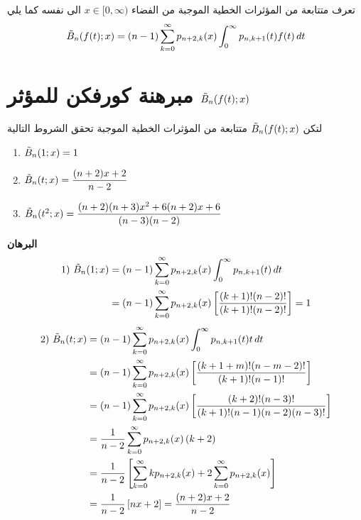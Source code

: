 تعرف متتابعة من المؤثرات الخطية الموجبة من الفضاء $x\in [0, \infty)$ الى نفسه كما يلي
\[
\tilde{B}_n(f(t); x) = (n-1)\sum_{k=0}^{\infty} p_{n+2, k}(x) \int_{0}^{\infty} p_{n, k+1}(t) f(t) \, dt
\]

\section{مبرهنة كورفكن للمؤثر $\tilde{B}_n(f(t); x)$}
لتكن $\tilde{B}_n(f(t); x)$ متتابعة من المؤثرات الخطية الموجبة  تحقق الشروط التالية
\begin{english}
	\begin{enumerate}[label=\arabic*)]
		\item $\tilde{B}_n(1; x) = 1$
		\item $\tilde{B}_n(t; x) = \dfrac{(n+2)x+2}{n-2}$
		\item $\tilde{B}_n(t^2; x) = \dfrac{(n+2)(n+3)x^2 + 6(n+2)x + 6}{(n-3)(n-2)}$
	\end{enumerate}
\end{english}
\noindent
\textbf{البرهان}
\begin{align*}
1)\,\,\tilde{B}_n(1; x) &= (n-1)\sum_{k=0}^{\infty} p_{n+2, k}(x) \int_{0}^{\infty} p_{n, k+1}(t)  \, dt\\
&= (n-1) \sum_{k=0}^{\infty} p_{n+2, k}(x) \left[\frac{(k+1)!(n-2)!}{(k+1)!(n-2)!}\right] = 1
\end{align*}
\begin{align*}
2)\,\,\tilde{B}_n(t; x) &= (n-1)\sum_{k=0}^{\infty} p_{n+2, k}(x) \int_{0}^{\infty} p_{n, k+1}(t)  t\, dt\\
&= (n-1)\sum_{k=0}^{\infty} p_{n+2, k}(x) \left[\frac{(k+1+m)!(n-m-2)!}{(k+1)!(n-1)!}\right]\\
&= (n-1)\sum_{k=0}^{\infty} p_{n+2, k}(x) \left[\frac{(k+2)!(n-3)!}{(k+1)!(n-1)(n-2)(n-3)!}\right]\\
&= \frac{1}{n-2}\sum_{k=0}^{\infty} p_{n+2, k}(x)\, (k+2)\\
&= \frac{1}{n-2}\left[\sum_{k=0}^{\infty} kp_{n+2, k}(x) + 2\sum_{k=0}^{\infty} p_{n+2, k}(x)\right]\\
&=\frac{1}{n-2}\left[nx+2\right] = \frac{(n+2)x+2}{n-2}
\end{align*}
